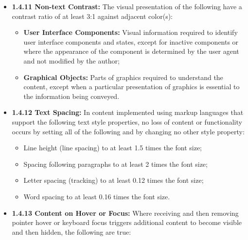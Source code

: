 \documentclass[
  letterpaper,
  DIV=11,
  numbers=noendperiod]{scrartcl}
\providecommand{\tightlist}{%
  \setlength{\itemsep}{0pt}\setlength{\parskip}{0pt}}\usepackage{longtable,booktabs,array}
\begin{document}
\begin{itemize}
  \begin{itemize}
  \tightlist
  \item
    Vertical scrolling content at a width equivalent to 320 CSS pixels;
  \item
    Horizontal scrolling content at a height equivalent to 256 CSS
    pixels;
  \end{itemize}

  Except for the parts of the content which require two-dimensional
  layout for usage or meaning.
\item
  \textbf{1.4.11 Non-text Contrast:} The visual presentation of the
  following have a contrast ratio of at least 3:1 against adjacent
  color(s):

  \begin{itemize}
  \tightlist
  \item
    \textbf{User Interface Components:} Visual information required to
    identify user interface components and states, except for inactive
    components or where the appearance of the component is determined by
    the user agent and not modified by the author;
  \item
    \textbf{Graphical Objects:} Parts of graphics required to understand
    the content, except when a particular presentation of graphics is
    essential to the information being conveyed.
  \end{itemize}
\item
  \textbf{1.4.12 Text Spacing:} In content implemented using markup
  languages that support the following text style properties, no loss of
  content or functionality occurs by setting all of the following and by
  changing no other style property:

  \begin{itemize}
  \tightlist
  \item
    Line height (line spacing) to at least 1.5 times the font size;
  \item
    Spacing following paragraphs to at least 2 times the font size;
  \item
    Letter spacing (tracking) to at least 0.12 times the font size;
  \item
    Word spacing to at least 0.16 times the font size.
  \end{itemize}
\item
  \textbf{1.4.13 Content on Hover or Focus:} Where receiving and then
  removing pointer hover or keyboard focus triggers additional content
  to become visible and then hidden, the following are true:


\end{itemize}
\end{document}
